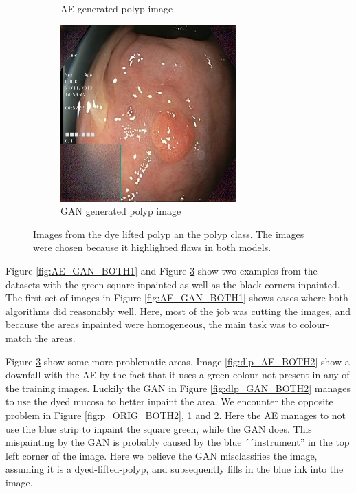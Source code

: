 \begin{figure}
\begin{subfigure}[t]{\myfigsizethree}
            \caption{AE generated polyp image}    
            \label{fig:p_AE_BOTH2}
        \end{subfigure}
        \qquad%
        \begin{subfigure}[t]{\myfigsizethree}   
            \centering 
            \includegraphics[width=\textwidth]{experiments/figures/both/greenGAN.jpg}
            \caption{GAN generated polyp image}    
            \label{fig:p_GAN_BOTH2}
        \end{subfigure}
        \caption{Images from the dye lifted polyp an the polyp class. The images were chosen because it highlighted flaws in both models. } 
        \label{fig:AE_GAN_BOTH2}
    \end{figure}

Figure \ref{fig:AE_GAN_BOTH1} and Figure \ref{fig:AE_GAN_BOTH2} show two examples from the datasets with the green square inpainted as well as the black corners inpainted.
The first set of images in Figure \ref{fig:AE_GAN_BOTH1} shows cases where both algorithms did reasonably well. Here, most of the job was cutting the images, and because the areas inpainted were homogeneous, the main task was to colour-match the areas.

Figure \ref{fig:AE_GAN_BOTH2} show some more problematic areas. Image \ref{fig:dlp_AE_BOTH2} show a downfall with the AE by the fact that it uses a green colour not present in any of the training images. Luckily the GAN in Figure \ref{fig:dlp_GAN_BOTH2} manages to use the dyed mucosa to better inpaint the area.
We encounter the opposite problem in Figure \ref{fig:p_ORIG_BOTH2}, \ref{fig:p_AE_BOTH2} and \ref{fig:p_GAN_BOTH2}. Here the AE manages to not use the blue strip to inpaint the square green, while the GAN does. 
This mispainting by the GAN is probably caused by the blue ´´instrument'' in the top left corner of the image. Here we believe the GAN misclassifies the image, assuming it is a dyed-lifted-polyp, and subsequently fills in the blue ink into the image.


